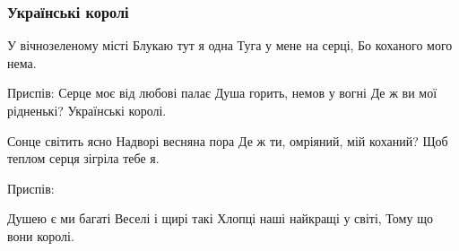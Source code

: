  
 
 

\subsubsection{Українські королі}
\label{sec:poetry.rus.anastasia_lagan_1954.ukrainski_koroli}

У вічнозеленому місті
Блукаю тут я одна
Туга у мене на серці,
Бо коханого мого нема.

Приспів:
Серце моє від любові палає
Душа горить, немов у вогні
Де ж ви мої рідненькі?
Українські королі.

Сонце світить ясно
Надворі весняна пора
Де ж ти, омріяний, мій коханий?
Щоб теплом серця зігріла тебе я.

Приспів:

Душею є ми багаті
Веселі і щирі такі
Хлопці наші найкращі у світі,
Тому що вони королі.

